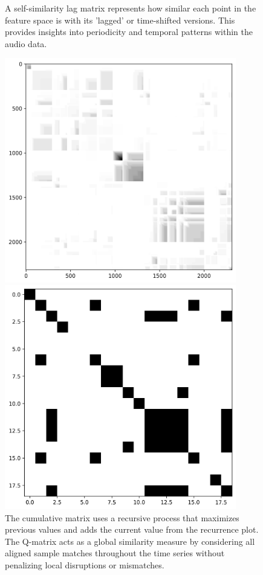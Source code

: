 \begin{figure}[ht]
\begin{minipage}{0.45\textwidth}
        \caption[Self-similarity lag matrix]{A self-similarity lag matrix represents how similar each point in the feature space is with its 'lagged' or time-shifted versions. This provides insights into periodicity and temporal patterns within the audio data.}
    \end{minipage}
    \vfill
    \begin{minipage}{0.45\textwidth}
        \centering
        \includegraphics[width=0.9\textwidth]{figures/images/salami_391_Q_matrix.png} %
        \caption[Q-matrix]{The cumulative matrix uses a recursive process that maximizes previous values and adds the current value from the recurrence plot. The Q-matrix acts as a global similarity measure by considering all aligned sample matches throughout the time series without penalizing local disruptions or mismatches.}
    \end{minipage}\hfill
    \begin{minipage}{0.45\textwidth}
        \centering
        \includegraphics[width=0.9\textwidth]{figures/images/salami_391_binary transitive matrix.png} %

\end{minipage}
\end{figure}
